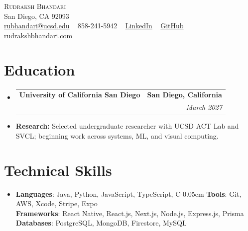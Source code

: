 \documentclass[letterpaper, 11pt]{article}
\makeatletter
\newcommand{\resumeSubheading}[4]{
\item
    \begin{tabular*}{1.0\textwidth}[t]{l@{\extracolsep{\fill}}r}
        \vspace{1pt}
      \textbf{\large #1} &    \vspace{1pt} \textbf{\small #2} \\
      \text{\large #3} & \textit{\small #4} \\
    \end{tabular*}\vspace{-10pt}
}
\newcommand{\resumeSubHeadingListStart}{\begin{itemize}[leftmargin=0.0in, label={}]}
\newcommand{\resumeSubHeadingListEnd}{\end{itemize}}
\makeatother
\begin{document}
\begin{center}
    {\Huge \scshape Rudraksh Bhandari} \\ \vspace{2pt}
    {San Diego, CA 92093} \\ \vspace{3pt}
    \href{mailto:rubhandari@ucsd.edu}{rubhandari@ucsd.edu} ~
    \small 858-241-5942 ~
    \href{https://www.linkedin.com/in/rudrakshbhandari}{LinkedIn}  ~
    \href{https://github.com/rudrakshbhandari}{GitHub} ~
    \href{https://rudrakshbhandari.com}{rudrakshbhandari.com}
    \vspace{-10pt}
\end{center}

\vspace{-10pt}
\section{Education}
  \resumeSubHeadingListStart
  \vspace{1pt}
    \resumeSubheading
      {University of California San Diego}{San Diego, California}
      {Bachelor of Science in Computer Science $|$ GPA: 3.9}{March 2027}
      \vspace{-4pt}
      \item \small{\textbf{Research:} Selected undergraduate researcher with UCSD ACT Lab and SVCL; beginning work across systems, ML, and visual computing.}
  \resumeSubHeadingListEnd

\vspace{-10pt}
\section{Technical Skills}
\vspace{0pt}
 \begin{itemize}[leftmargin=0.00in, label={}]
    \item{\small{
\textbf{Languages}{: Java, Python, JavaScript, TypeScript, C\kern-0.05em\raisebox{0.2ex}{\small ++}} \hspace{16pt}
\textbf{Tools}{: Git, AWS, Xcode, Stripe, Expo} \\
\textbf{Frameworks}{: React Native, React.js, Next.js, Node.js, Express.js, Prisma} \\
\textbf{Databases}{: PostgreSQL, MongoDB, Firestore, MySQL}
}}
 \end{itemize}

\vspace{-15pt}
\end{document}
